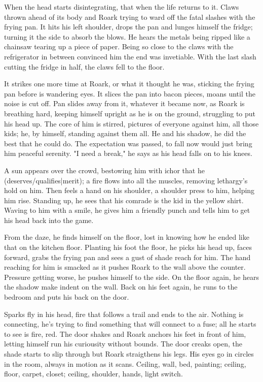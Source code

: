         When the head starts disintegrating, that when the life returns to it. Claws thrown ahead of its body and Roark trying to ward off the
    fatal slashes with the frying pan. It hits his left shoulder, drops the pan and lunges himself the fridge; turning it the side to absorb
    the blows. He hears the metals being ripped like a chainsaw tearing up a piece of paper. Being so close to the claws with the refrigerator
    in between convinced him the end was invetiable. With the last slash cutting the fridge in half, the claws fell to the floor. 

        It strikes one more time at Roark, or what it thought he was, sticking the frying pan before is wandering eyes. It slices the pan into
    bacon pieces, moans until the noise is cut off. Pan slides away from it, whatever it became now, as Roark is breathing hard, keeping himself
    upright as he is on the ground, struggling to put his head up. The core of him is stirred, pictures of everyone against him, all those kids;
    he, by himself, standing against them all. He and his shadow, he did the best that he could do. The expectation was passed, to fall now
    would just bring him peaceful serenity. "I need a break," he says as his head falls on to his knees.

       A sun appears over the crowd, bestowing him with ichor that he (deserves/qualifies|merit); a fire flows into all the muscles, removing lethargy's
    hold on him. Then feels a hand on his shoulder, a shoulder press to him, helping him rise. Standing up, he sees that his comrade is the
    kid in the yellow shirt. Waving to him with a smile, he gives him a friendly punch and tells him to get his head back into the game.

        From the daze, he finds himself on the floor, lost in knowing how he ended like that on the kitchen floor. Planting his foot the floor,
    he picks his head up, faces forward, grabs the frying pan and sees a gust of shade reach for him. The hand reaching for him is smacked as
    it pushes Roark to the wall above the counter. Pressure getting worse, he pushes himself to the side.  On the floor again, he hears the
    shadow make indent on the wall. Back on his feet again, he runs to the bedroom and puts his back on the door.

        Sparks fly in his head, fire that follows a trail and ends to the air. Nothing is connecting, he's trying to find something that will
    connect to a fuse; all he starts to see is fire, red. The door shakes and Roark anchors his feet in front of him, letting himself run
    his curiousity without bounds. The door creaks open, the shade starts to slip through but Roark straigthens his legs. His eyes go in circles
    in the room, always in motion as it scans. Ceiling, wall, bed, painting; ceiling, floor, carpet, closet; ceiling, shoulder, hands, light
    switch.

